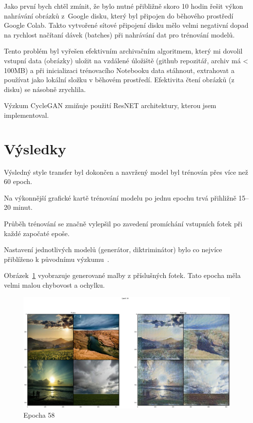 \documentclass[czech]{mvi-report}
\begin{document}
Jako první bych chtěl zmínit, že bylo nutné přibližně skoro 10 hodin řešit výkon nahrávání obrázků z~Google disku, který byl připojen do běhového prostředí Google Colab.
Takto vytvořené sítové připojení disku mělo velmi negativní dopad na rychlost načítaní dávek (batches) při nahrávání dat pro trénování modelů.

Tento problém byl vyřešen efektivním archivačním algoritmem, který mi dovolil vstupní data (obrázky) uložit na vzdálené úložiště (github repozitář, archiv má < 100MB) a při inicializaci trénovacího Notebooku data stáhnout, extrahovat a používat jako lokální složku v běhovém prostředí. Efektivita čtení obrázků (z disku) se násobně zrychlila.

Výzkum CycleGAN zmiňuje použití ResNET architektury, kterou jsem implementoval.

\section{Výsledky}

Výsledný style transfer byl dokončen a navržený model byl trénován přes více než 60 epoch.

Na výkonnější grafické kartě trénování modelu po jednu epochu trvá přihližně 15--20 minut.

Průběh trénování se značně vylepšil po zavedení promíchání vstupních fotek při každé započaté epoše.

Nastavení jednotlivých modelů (generátor, diktriminátor) bylo co nejvíce přiblíženo k původnímu výzkumu~\cite{CycleGAN}.

Obrázek~\ref{fig:epoch-58} vyobrazuje generované malby z příslušných fotek.
Tato epocha měla velmi malou chybovost a ochylku.

\begin{figure}[h]
  \centering\leavevmode
  \includegraphics[width=1\linewidth]{img/epochs/e58}\vskip-0.5cm
  \caption{Epocha 58}
  \label{fig:epoch-58}
\end{figure}
\end{document}
